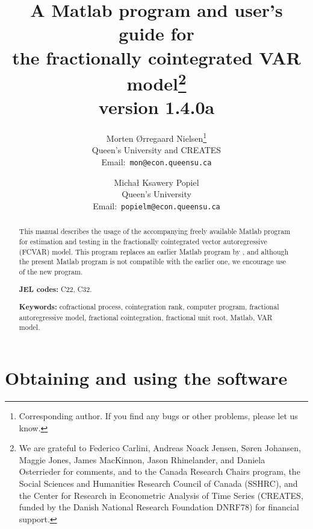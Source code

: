 \documentclass[10pt]{article}
\begin{document}
 
\title{A Matlab program and user's guide for\\the fractionally cointegrated VAR model\thanks{We are grateful to Federico Carlini, Andreas Noack Jensen, S\o ren Johansen, Maggie Jones, James MacKinnon, Jason Rhinelander, and Daniela Osterrieder for comments, and to the Canada Research Chairs program, the Social Sciences and Humanities Research Council of Canada (SSHRC), and the Center for Research in Econometric Analysis of Time Series (CREATES, funded by the Danish National Research Foundation DNRF78) for financial support.}
\bigskip
\\version 1.4.0a
\bigskip} 
\author{Morten \O rregaard Nielsen\thanks{Corresponding author. If you find any bugs or other problems, please let us know.} \\
Queen's University and CREATES \\
Email:\ \texttt{mon@econ.queensu.ca}
\and Micha\l{} Ksawery Popiel \\
Queen's University \\
Email:\ \texttt{popielm@econ.queensu.ca}}


\maketitle

\begin{abstract}
This manual describes the usage of the accompanying freely available Matlab program for estimation and testing in the fractionally cointegrated vector autoregressive (FCVAR) model. This program replaces an earlier Matlab program by \cite{Nielsen2013}, and although the present Matlab program is not compatible with the earlier one, we encourage use of the new program.

\bigskip \noindent \textbf{JEL codes:} C22, C32.

\medskip \noindent \textbf{Keywords:} cofractional process, cointegration rank, computer program, fractional autoregressive model, fractional cointegration, fractional unit root, Matlab, VAR model.

\end{abstract}

\newpage

\tableofcontents

\newpage

\section{Obtaining and using the software\label{sec obtaining}}
\end{document}
